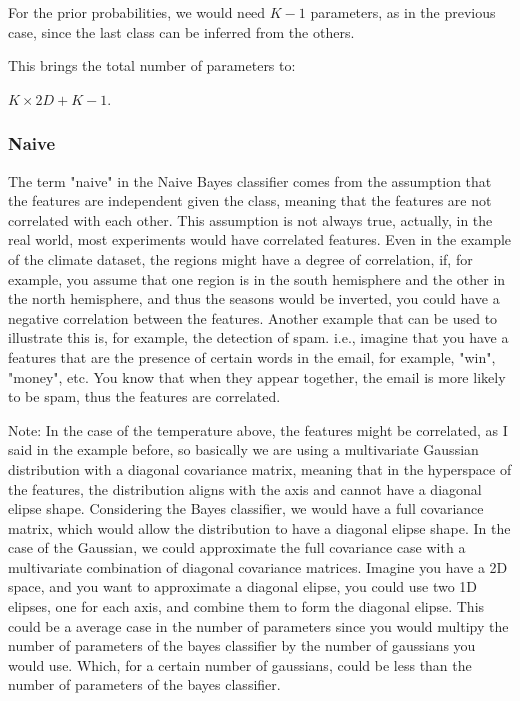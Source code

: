 \documentclass[12pt,a4paper,oneside]{paper}
\begin{document}
For the prior probabilities, we would need $K - 1$ parameters, as in the previous case, since the last class can be inferred from the others.

This brings the total number of parameters to:

$K \times 2D + K - 1$.

\subsubsection*{Naive}

The term "naive" in the Naive Bayes classifier comes from the assumption that the features are independent given the class, 
meaning that the features are not correlated with each other.
This assumption is not always true, actually, in the real world, most experiments would have correlated features. 
Even in the example of the climate dataset, the regions might have a degree of correlation, if, for example, you assume that
one region is in the south hemisphere and the other in the north hemisphere, and thus the seasons would be inverted, you could have
a negative correlation between the features.
Another example that can be used to illustrate this is, for example, the detection of spam. i.e., imagine that 
you have a features that are the presence of certain words in the email, for example, "win", "money", etc. You know
that when they appear together, the email is more likely to be spam, thus the features are correlated.

Note: In the case of the temperature above, the features might be correlated, as I said in the example before, 
so basically we are using a multivariate Gaussian distribution with a diagonal covariance matrix, meaning that 
in the hyperspace of the features, the distribution aligns with the axis and cannot have a diagonal elipse shape.
Considering the Bayes classifier, we would have a full covariance matrix, which would allow the distribution to have a diagonal elipse shape. 
In the case of the Gaussian, we could approximate the full covariance case with a multivariate combination of diagonal covariance matrices. 
Imagine you have a 2D space, and you want to approximate a diagonal elipse, you could use two 1D elipses, one for each axis, and combine them to form the diagonal elipse.
This could be a average case in the number of parameters since you would multipy the number of parameters of the bayes classifier by the number of gaussians you would use. 
Which, for a certain number of gaussians, could be less than the number of parameters of the bayes classifier. 
\end{document}
